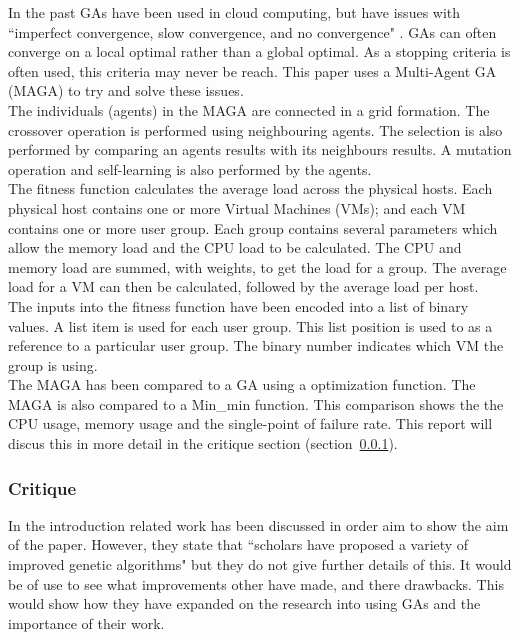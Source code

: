 \documentclass[10pt,a4paper,openbib]{article}
\begin{document}
\begin{multicols}{2}
\noindent In the past GAs have been used in cloud computing, but have issues with ``imperfect convergence, slow convergence, and no convergence" \cite{CloudComputing}. GAs can often converge on a local optimal rather than a global optimal. As a stopping criteria is often used, this criteria may never be reach. This paper uses a Multi-Agent GA (MAGA) to try and solve these issues. \\

\noindent The individuals (agents) in the MAGA are connected in a grid formation. The crossover operation is performed using neighbouring agents. The selection is also performed by comparing an agents results with its neighbours results. A mutation operation and self-learning is also performed by the agents.\\

\noindent The fitness function calculates the average load across the physical hosts. Each physical host contains one or more Virtual Machines (VMs); and each VM contains one or more user group. Each group contains several parameters which allow the memory load and the CPU load to be calculated. The CPU and memory load are summed, with weights, to get the load for a group. The average load for a VM can then be calculated, followed by the average load per host. \\

\noindent The inputs into the fitness function have been encoded into a list of binary values. A list item is used for each user group. This list position is used to as a reference to a particular user group. The binary number indicates which VM the group is using. \\

\noindent The MAGA has been compared to a GA using a optimization function. The MAGA is also compared to a Min\_min function. This comparison shows the the CPU usage, memory usage and the single-point of failure rate. This report will discus this in more detail in the critique section (section~\ref{critique_MAGA}).

\subsubsection{Critique} \label{critique_MAGA}
In the introduction related work has been discussed in order aim to show the aim of the paper. However, they state that ``scholars have proposed a variety of improved genetic algorithms" but they do not give further details of this. It would be of use to see what improvements other have made, and there drawbacks. This would show how they have expanded on the research into using GAs and the importance of their work.\\


\end{multicols}
\end{document}
